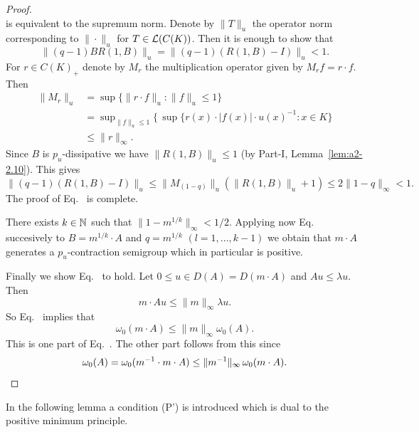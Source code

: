 \begin{proof}
\[\]
is equivalent to the supremum norm.
Denote by $\|T\|_{u}$ the operator norm corresponding to $\|\cdot\|_{u}$ for $T \in \mathcal{L}(C(K))$.
Then it is enough to show that 
%
\[
	 \|(q-1)BR(1,B)\|_{u} = \|(q-1)(R(1,B) - I)\|_{u} < 1 .
\]
%
For $r \in C(K)_{+}$ denote by $M_{r}$ the multiplication operator given by $M_{r}f = r \cdot f$.
Then 
\begin{align*}
	    \|M_{r}\|_{u} &= \sup\{\|r \cdot f\|_{u} \colon \|f\|_{u} \leq 1\} \\
	              &= \sup\nolimits_{\|f\|_{u} \leq 1}\{ \, 
	              \sup \{ r(x) \cdot |f(x)| \cdot u(x)^{-1}  \colon {x \in K} \}  \\
	              &\leq \|r\|_{\infty}.
\end{align*}
Since $B$ is $p_{u}$-dissipative we have $\|R(1,B)\|_{u} \leq 1$ (by Part-I, Lemma~\ref{lem:a2-2.10}).
This gives 
%
\[
	\|(q-1)(R(1,B) - I)\|_{u} \leq \|M_{(1-q)}\|_{u}(\|R(1,B)\|_{u} + 1) \leq 2\|1 - q\|_{\infty} < 1 .
\]
%
The proof of Eq.~ is complete.

There exists $k \in \mathbb{N}$ such that $\|1 - m^{1/k}\|_{\infty} < 1/2$.
Applying now Eq.~ 
succesively to $B = m^{1/k} \cdot A$ and $q = m^{1/k}$ $(l = 1, \ldots, k-1)$ we obtain that $m \cdot A$ generates a $p_{u}$-contraction semigroup which in particular is positive.

Finally we show Eq.~ to hold.
Let $0 \leq  u \in D(A) = D(m \cdot A)$ and $Au \leq \lambda u$.
Then 
%
\[
	m \cdot Au \leq \|m\|_{\infty}\lambda u .
\]
%
So Eq.~ implies that
%
\[
	  \omega_{0}(m \cdot A) \leq \|m\|_{\infty}\omega_{0}(A) .
\]
%
This is one part of Eq.~. 
The other part follows from this since 
%
\begin{equation*}
	\omega_{0}(A) = \omega_{0}(m^{-1} \cdot m \cdot A) \leq \|m^{-1}\|_{\infty} \, \omega_{0}(m \cdot A).
	\qedhere
\end{equation*}
%
\end{proof}
In the following lemma a condition (P') is introduced which is dual to the positive minimum principle.

